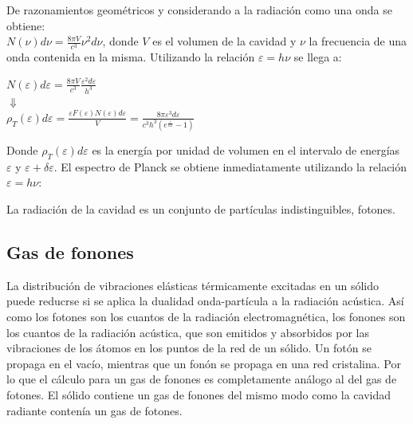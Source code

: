 \documentclass[oneside]{book}
\numberwithin{equation}{section}
\numberwithin{figure}{section}
\numberwithin{table}{section}
\begin{document}
				De razonamientos geométricos y considerando a la radiación como una onda se obtiene:\\
				
				 $\displaystyle N(\nu)d\nu=\frac{8\pi V}{c^3}\nu^2 d\nu$, donde $V$ es el volumen de la cavidad y $\nu$ la frecuencia de una onda contenida en la misma. Utilizando la relación $\varepsilon=h \nu$ se llega a:
				 
				 \begin{center}
				 	$\displaystyle N(\varepsilon)d\varepsilon=\frac{8\pi V}{c^3}\frac{\varepsilon^2d\varepsilon}{h^3}$\\
				 	$\Downarrow$\\
				 	$\displaystyle \rho_T(\varepsilon)d\varepsilon=\frac{\varepsilon F(\varepsilon)N(\varepsilon)d\varepsilon}{V}=\frac{8\pi \varepsilon^3 d\varepsilon}{c^3h^3(e^{\frac{\varepsilon}{kT}}-1)}$
				 \end{center}
				 
				 Donde $\displaystyle \rho_T(\varepsilon)d\varepsilon$ es la energía por unidad de volumen en el intervalo de energías $\varepsilon$ y $\varepsilon+\delta \varepsilon$. El espectro de Planck se obtiene inmediatamente utilizando la relación $\varepsilon=h \nu$:
				 
				 \begin{center}
				 \end{center}
				 
				 La radiación de la cavidad es un conjunto de partículas indistinguibles, fotones.
				 
				 \subsection{Gas de fonones}
			
					La distribución de vibraciones elásticas térmicamente excitadas en un sólido puede reducrse si se aplica la dualidad onda-partícula a la radiación acústica. Así como los fotones son los cuantos de la radiación electromagnética, los fonones son los cuantos de la radiación acústica, que son emitidos y absorbidos por las vibraciones de los átomos en los puntos de la red de un sólido. Un fotón se propaga en el vacío, mientras que un fonón se propaga en una red cristalina. Por lo que el cálculo para un gas de fonones es completamente análogo al del gas de fotones. El sólido contiene un gas de fonones del mismo modo como la cavidad radiante contenía un gas de fotones.\\
\end{document}
